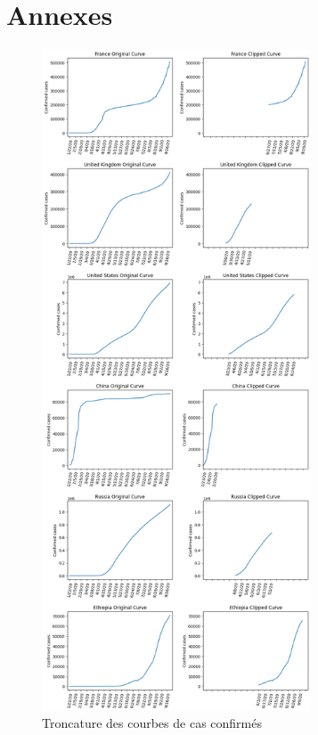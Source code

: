 \documentclass[12pt]{iEEEtran}
\begin{document}
\section{Annexes}
\begin{figure}[h]
    \centering
    \includegraphics[width=8cm]{img/clip_full.png}
    \caption{Troncature des courbes de cas confirmés}
    \label{fig:clip_full}
\end{figure}
\end{document}
